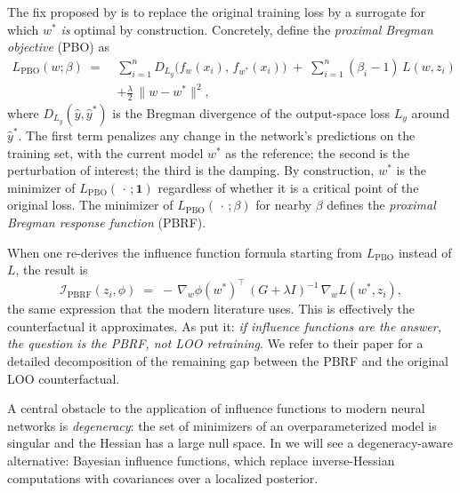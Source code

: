 \documentclass[11pt]{article}
\begin{document}
The fix proposed by \citet{bae2022if} is to replace the original training loss by a surrogate for which $w^*$ \emph{is} optimal by construction. Concretely, define the \emph{proximal Bregman objective} (PBO) as
\begin{equation}
  \begin{aligned}
    L_{\mathrm{PBO}}(w;\beta) \;=\;& \sum_{i=1}^{n} D_{L_y}\!\bigl(f_w(x_i),\,f_{w^*}(x_i)\bigr) \;+\; \sum_{i=1}^{n}(\beta_i - 1)\,L(w,z_i) \\
    &+ \frac{\lambda}{2}\,\|w - w^*\|^2,
  \end{aligned}
  \label{eq:pbo}
\end{equation}
where $D_{L_y}(\hat y,\hat y^*)$ is the Bregman divergence of the output-space loss $L_y$ around $\hat y^*$. The first term penalizes any change in the network's predictions on the training set, with the current model $w^*$ as the reference; the second is the perturbation of interest; the third is the damping. By construction, $w^*$ is the minimizer of $L_{\mathrm{PBO}}(\,\cdot\,;\mathbf{1})$ regardless of whether it is a critical point of the original loss. The minimizer of $L_{\mathrm{PBO}}(\,\cdot\,;\beta)$ for nearby $\beta$ defines the \emph{proximal Bregman response function} (PBRF).

When one re-derives the influence function formula starting from $L_{\mathrm{PBO}}$ instead of $L$, the result is
\begin{equation}
  \mathcal{I}_{\mathrm{PBRF}}(z_i,\phi) \;=\; -\,\nabla_w\phi(w^*)^\top\,(G + \lambda I)^{-1}\,\nabla_w L(w^*,z_i),
  \label{eq:if-pbrf}
\end{equation}
the same expression that the modern literature uses.
This is effectively the counterfactual it approximates. As \citet{bae2022if} put it: \emph{if influence functions are the answer, the question is the PBRF, not LOO retraining}. We refer to their paper for a detailed decomposition of the remaining gap between the PBRF and the original LOO counterfactual.

\begin{remark}\label{rem:slt-connection}
A central obstacle to the application of influence functions to modern neural networks is \emph{degeneracy}: the set of minimizers of an overparameterized model is singular and the Hessian has a large null space. In  we will see a degeneracy-aware alternative: Bayesian influence functions, which replace inverse-Hessian computations with covariances over a localized posterior.
\end{remark}
\end{document}
